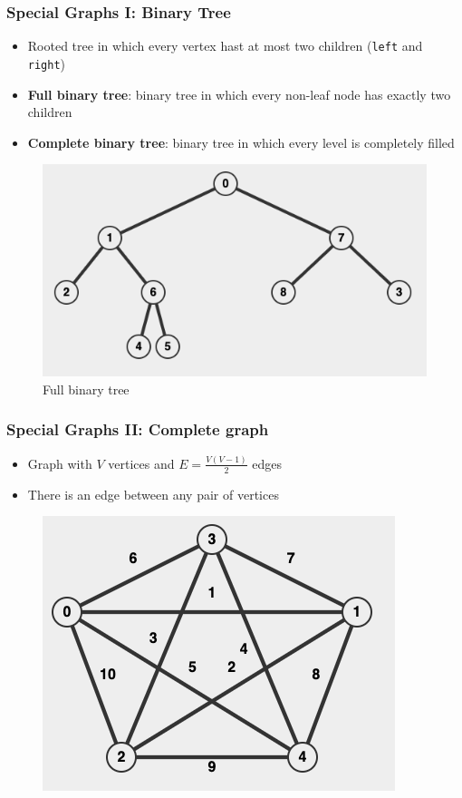 \documentclass{beamer}
\begin{document}
\begin{frame}[fragile]
\frametitle{Special Graphs I: Binary Tree}
	\begin{itemize}
	    \item Rooted tree in which every vertex hast at most two children (\verb|left| and \verb|right|)
	    \item \textbf{Full binary tree}: binary tree in which every non-leaf node has exactly two children
	    \item \textbf{Complete binary tree}: binary tree in which every level is completely filled
	\end{itemize}
	\begin{figure}
	    \centering
	    \includegraphics[scale=0.2]{imgs/2.4/graph/full-binary-tree.png}
	    \caption{Full binary tree}
	\end{figure}
\end{frame}

\begin{frame}
\frametitle{Special Graphs II: Complete graph}
	\begin{itemize}
	    \item Graph with $V$ vertices and $E = \frac{V(V-1)}{2}$ edges
	    \item There is an edge between any pair of vertices
	\end{itemize}
	
	\begin{figure}
	    \centering
	    \includegraphics[scale=0.3]{imgs/2.4/graph/complete-graph.png}
	\end{figure}
\end{frame}
\end{document}
